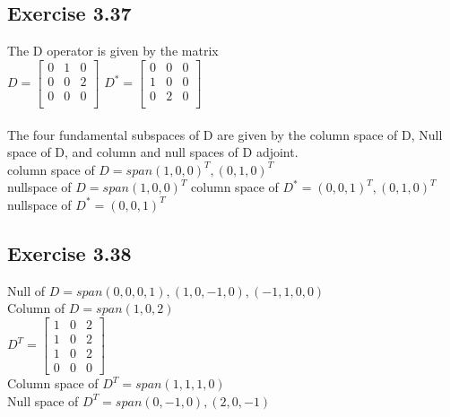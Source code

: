 \documentclass[letterpaper,12pt]{article}
\theoremstyle{definition}
\begin{document}
\subsection*{Exercise 3.37}
The D operator is given by the matrix\\
$D = \begin{bmatrix} 
0&1&0\\
0&0&2\\
0&0&0\\
\end{bmatrix}$
$D^*  = \begin{bmatrix} 
0&0&0\\
1&0&0\\
0&2&0\\
\end{bmatrix}$\\
\smallskip\\
The four fundamental subspaces of D are given by the column space of D, Null space of D, and column and null spaces of D adjoint. \\
column space of $D = span(1,0,0)^T,(0,1,0)^T$\\
nullspace of $D = span(1,0,0)^T $
column space of $D^* = (0,0,1)^T, (0,1,0)^T$\\
nullspace of $D^* =  (0,0,1)^T$

\subsection*{Exercise 3.38}
Null of $D = span(0,0,0,1), (1,0,-1,0), (-1,1,0,0)$\\
Column of $D = span(1,0,2)$\\
$D^T=\begin{bmatrix}
1 &0&2\\
1&0&2\\
1&0&2\\
0&0&0
\end{bmatrix}$\\
Column space of $D^T = span(1,1,1,0)$\\
Null space of $D^T = span(0,-1,0), (2,0,-1) $\\
\end{document}
